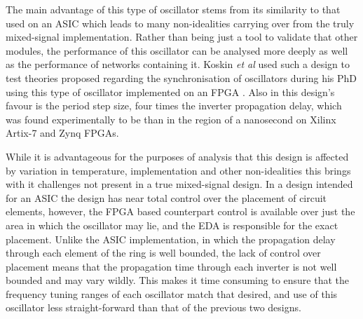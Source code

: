 The main advantage of this type of oscillator stems from its similarity to that used on an \ac{ASIC} which leads to many non-idealities carrying over from the truly mixed-signal implementation. Rather than being just a tool to validate that other modules, the performance of this oscillator can be analysed more deeply as well as the performance of networks containing it. Koskin \textit{et al} used such a design to test theories proposed regarding the synchronisation of oscillators during his PhD using this type of oscillator implemented on an \ac{FPGA} \cite{koskin2019phd,theboys2019}. Also in this design's favour is the period step size, four times the inverter propagation delay, which was found experimentally to be than in the region of a nanosecond on Xilinx Artix-7 and Zynq \ac{FPGA}s.

While it is advantageous for the purposes of analysis that this design is affected by variation in temperature, implementation and other non-idealities this brings with it challenges not present in a true mixed-signal design. In a design intended for an \ac{ASIC} the design has near total control over the placement of circuit elements, however, the \ac{FPGA} based counterpart control is available over just the area in which the oscillator may lie, and the \ac{EDA} is responsible for the exact placement. Unlike the \ac{ASIC} implementation, in which the propagation delay through each element of the ring is well bounded, the lack of control over placement means that the propagation time through each inverter is not well bounded and may vary wildly. This makes it time consuming to ensure that the frequency tuning ranges of each oscillator match that desired, and use of this oscillator less straight-forward than that of the previous two designs.

